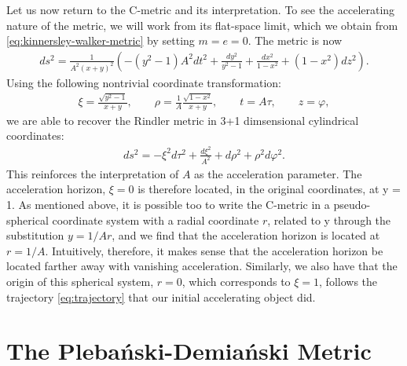 \documentclass[
twoside,
openright,
frontopenright
]{dmathesis}
\begin{document}
Let us now return to the C-metric and its interpretation. To see the
accelerating nature of the metric, we will work from its flat-space limit, which
we obtain from \cref{eq:kinnersley-walker-metric} by setting $m=e=0$. The metric
is now
\begin{align}
  \label{eq:flatlimit}
  ds^2=\frac{1}{A^2(x+y)^2}\left(-(y^2-1)A^2dt^2+\frac{dy^2}{y^2-1} +
  \frac{dx^2}{1-x^2} + (1-x^2)dz^2\right).
\end{align}
Using the following nontrivial coordinate transformation:
\begin{align}
  \xi = \frac{\sqrt{y^2-1}}{x + y}, \qquad \rho =
  \frac{1}{A}\frac{\sqrt{1-x^2}}{x+y}, \qquad t=A\tau, \qquad z=\varphi,
\end{align}
we are able to recover the Rindler metric in 3+1 dimsensional cylindrical
coordinates:
\begin{align}
  \label{eq:rindler}
  ds^2 = -\xi^2 d\tau^2 + \frac{d\xi^2}{A^2} + d\rho^2 + \rho^2 d\varphi^2.
\end{align}
This reinforces the interpretation of $A$ as the acceleration parameter. The
acceleration horizon, $\xi = 0$ is therefore located, in the original
coordinates, at y = 1. As mentioned above, it is possible too to write the
C-metric in a pseudo-spherical coordinate system with a radial coordinate $r$,
related to y through the substitution $y = 1/Ar$, and we find that the
acceleration horizon is located at $r = 1/A$. Intuitively, therefore, it makes
sense that the acceleration horizon be located farther away with vanishing
acceleration. Similarly, we also have that the origin of this spherical system,
$r = 0$, which corresponds to $\xi = 1$, follows the trajectory
\eqref{eq:trajectory} that our initial accelerating object did.


\section{The Pleba\'nski-Demia\'nski Metric}
\label{sec:PD}
\end{document}
